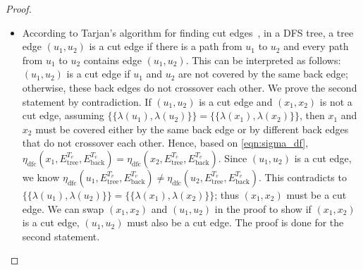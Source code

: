 \begin{proof}
\begin{itemize}
    For a type-2 cut vertex $u$, it is obvious that $D^{T_v}_u \neq \varnothing$ and thus the colour of $u$ is clearly different from any leaf vertices or any type-1 cut vertices. So now we just need to show $\lambda_G(u) \neq \lambda_H(x)$ when $x$ is a non-cut vertex in a biconnected component. 
    Because $u$ is a type-2 cut vertex, $\eta_{\text{dfc}}(u,E_{\text{tree}}^{T_v},E_{\text{back}}^{T_v})$ includes all vertices in the biconnected components in which $u$ participates (at least two biconnected components), while for a non-cut vertex $x$, $\eta_{\text{dfc}}(u,E_{\text{tree}}^{T_v},E_{\text{back}}^{T_v})$ includes only vertices in a single biconnected component. %
    So a type-2 cut vertex has a different number of vertices in $\eta_{\text{dfc}}(u,E_{\text{tree}}^{T_v},E_{\text{back}}^{T_v})$ comparing with a non-cut vertex.
    Therefore, it is easy to see that $\lambda_G(u) \neq \lambda_H(x)$ when $u$ is a type-2 cut vertex and $x$ is a non-cut vertex in a biconnected component.

    Hence, if $\lambda_G(u)=\lambda_G(x)$, and $x$ is a cut vertex if and only if $u$ is a vertex. The proof for the first statement is done.

    \item According to Tarjan's algorithm for finding cut edges~\citep{Tarjan1974-eb}, in a DFS tree, a tree edge $(u_1, u_2)$ is a cut edge if there is a path from $u_1$ to $u_2$ and every path from $u_1$ to $u_2$ contains edge $(u_1, u_2)$. This can be interpreted as follows: $(u_1, u_2)$ is a cut edge if $u_1$ and $u_2$ are not covered by the same back edge; otherwise, these back edges do not crossover each other. We prove the second statement by contradiction. 
    If $(u_1, u_2)$ is a cut edge and 
    $(x_1, x_2)$ is not a cut edge, assuming 
    $\{\!\!\{ \lambda(u_1), \lambda(u_2)\}\!\!\} = \{\!\!\{ \lambda(x_1), \lambda(x_2)\}\!\!\}$, then $x_1$ and $x_2$ must be covered either by the same back edge or by different back edges that do not crossover each other. Hence, based on \cref{eqn:sigma_df}, $\eta_{\text{dfc}}(x_1,E_{\text{tree}}^{T_v},E_{\text{back}}^{T_v}) = \eta_{\text{dfc}}(x_2,E_{\text{tree}}^{T_v},E_{\text{back}}^{T_v})$. Since $(u_1, u_2)$ is a cut edge, we know $\eta_{\text{dfc}}(u_1,E_{\text{tree}}^{T_v},E_{\text{back}}^{T_v}) \neq \eta_{\text{dfc}}(u_2,E_{\text{tree}}^{T_v},E_{\text{back}}^{T_v})$. This contradicts to $\{\!\!\{ \lambda(u_1), \lambda(u_2)\}\!\!\} = \{\!\!\{ \lambda(x_1), \lambda(x_2)\}\!\!\}$; thus $(x_1, x_2)$ must be a cut edge. We can swap $(x_1, x_2)$ and $(u_1, u_2)$ in the proof to show if $(x_1, x_2)$ is a cut edge, $(u_1, u_2)$ must also be a cut edge. The proof is done for the second statement.


\end{itemize}
\end{proof}
